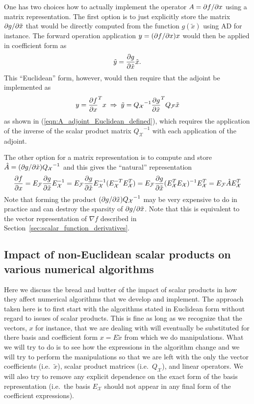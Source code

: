 One has two choices how to actually implement the operator $A = \partial f / \partial x$
using a matrix representation.  The first option is to just explicitly store
the matrix $\partial g / \partial \tilde{x}$ that would be directly computed from the
function $g(\tilde{x})$ using AD for instance.  The forward operation
application $y = (\partial f / \partial x) x$ would then be applied in coefficient form as
%
\[
\tilde{y} = \displaystyle{\frac{\partial g}{\partial \tilde{x}}} \tilde{x}.
\]
%
This ``Euclidean'' form, however, would then require that the adjoint be
implemented as
%
\begin{equation}
y = {\displaystyle{\frac{\partial f}{\partial x}}}^T x \; \Rightarrow \;
\tilde{y} = {Q_{\mathcal{X}}}^{-1} {\displaystyle{\frac{\partial g}{\partial \tilde{x}}}}^T Q_{\mathcal{F}} \tilde{x}
\label{eqn:Euclidean_adjoint_jac_apply}
\end{equation}
%
as shown in (\ref{eqn:A_adjoint_Euclidean_defined}), which requires the
application of the inverse of the scalar product matrix
${Q_{\mathcal{X}}}^{-1}$ with each application of the adjoint.

The other option for a matrix representation is to compute and store
$\hat{A} = (\partial g / \partial \tilde{x}) {Q_{\mathcal{X}}}^{-1}$ and this gives the ``natural''
representation
%
\begin{equation}
\displaystyle{\frac{\partial f}{\partial x}} = E_{\mathcal{F}} \displaystyle{\frac{\partial g}{\partial \tilde{x}}} E_{\mathcal{X}}^{-1}
= E_{\mathcal{F}} \displaystyle{\frac{\partial g}{\partial \tilde{x}}} E_{\mathcal{X}}^{-1} ( E_{\mathcal{X}}^{-T} E_{\mathcal{X}}^T ) 
= E_{\mathcal{F}} \displaystyle{\frac{\partial g}{\partial \tilde{x}}} ( E_{\mathcal{X}}^T E_{\mathcal{X}} )^{-1} E_{\mathcal{X}}^T 
= E_{\mathcal{F}} \hat{A} E_{\mathcal{X}}^T
\label{eqn:d_f_d_x_natural_rep}
\end{equation}
%
Note that forming the product $(\partial g / \partial \tilde{x}) {Q_{\mathcal{X}}}^{-1}$
may be very expensive to do in practice and can destroy the sparsity of
$\partial g / \partial \tilde{x}$.  Note that this is equivalent to the vector
representation of $\nabla f$ described in
Section~\ref{sec:scalar_function_derivatives}.

\subsection{Impact of non-Euclidean scalar products on various numerical algorithms}

Here we discuss the bread and butter of the impact of scalar products in how
they affect numerical algorithms that we develop and implement.  The approach
taken here is to first start with the algorithms stated in Euclidean form
without regard to issues of scalar products.  This is fine as long as we
recognize that the vectors, $x$ for instance, that we are dealing with will
eventually be substituted for there basis and coefficient form $x =
E\tilde{x}$ from which we do manipulations.  What we will try to do is to see
how the expressions in the algorithm change and we will try to perform the
manipulations so that we are left with the only the vector coefficients (i.e.\
$\tilde{x}$), scalar product matrices (i.e.\ $Q_{\mathcal{X}}$), and linear
operators.  We will also try to remove any explicit dependence on the exact
form of the basis representation (i.e.\ the basis $E_{\mathcal{X}}$ should not
appear in any final form of the coefficient expressions).


